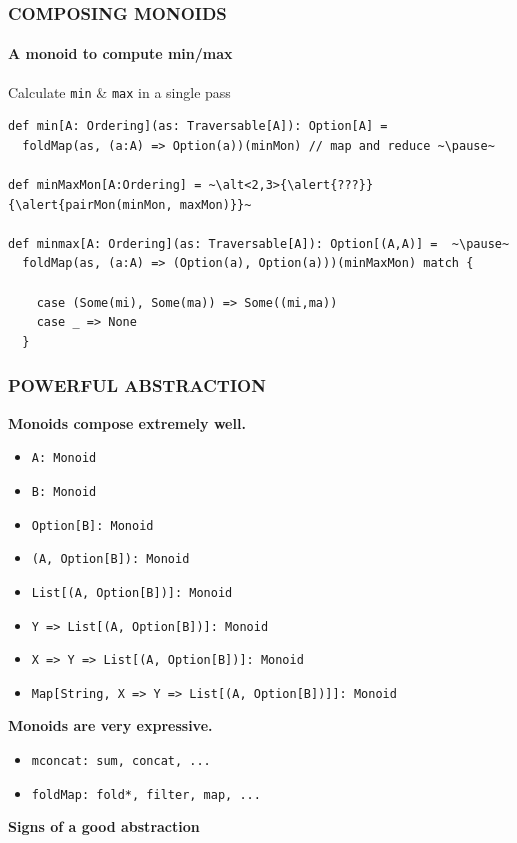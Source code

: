 \documentclass{beamer}
\begin{document}
\begin{frame}[fragile] \frametitle{COMPOSING MONOIDS}
  \framesubtitle{A monoid to compute min/max}
  \begin{block}{Calculate \texttt{min} \& \texttt{max} in a \alert{single pass}}
  \begin{lstlisting}
def min[A: Ordering](as: Traversable[A]): Option[A] =
  foldMap(as, (a:A) => Option(a))(minMon) // map and reduce ~\pause~

def minMaxMon[A:Ordering] = ~\alt<2,3>{\alert{???}}{\alert{pairMon(minMon, maxMon)}}~

def minmax[A: Ordering](as: Traversable[A]): Option[(A,A)] =  ~\pause~
  foldMap(as, (a:A) => (Option(a), Option(a)))(minMaxMon) match {

    case (Some(mi), Some(ma)) => Some((mi,ma))
    case _ => None
  }
  \end{lstlisting}
  \end{block}

\end{frame}

\begin{frame} \frametitle{POWERFUL ABSTRACTION}
  \textbf{\large Monoids compose extremely well.}
  \begin{itemize}
    \item \texttt{A: Monoid}
    \item \texttt{B: Monoid}
      \pause
    \item \texttt{Option[B]: Monoid}
      \pause
    \item \texttt{(A, Option[B]): Monoid}
    \item \texttt{List[(A, Option[B])]: Monoid}
      \pause
    \item \texttt{Y => List[(A, Option[B])]: Monoid}
      \pause
    \item \texttt{X => Y => List[(A, Option[B])]: Monoid}
    \item \texttt{Map[String, X => Y => List[(A, Option[B])]]: Monoid}
  \end{itemize}

  \textbf{\large Monoids are very expressive.}
  \pause
  \begin{itemize}
    \item \texttt{mconcat: sum, concat, ...}
    \item \texttt{foldMap: fold*, filter, map, ...}
  \end{itemize}

  \begin{block}{}
    \centering
    \Large \textbf{Signs of a good abstraction}
  \end{block}
\end{frame}
\end{document}
